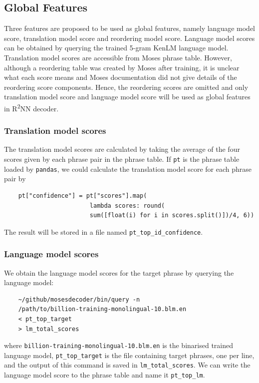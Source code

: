 \documentclass[12pt,a4paper,twoside,openright]{report}
\begin{document}
\subsection{Global Features} \label{global_features}
Three features are proposed to be used as global features, namely language model score, translation model score and reordering model score. Language model scores can be obtained by querying the trained 5-gram KenLM language model. Translation model scores are accessible from Moses phrase table. However, although a reordering table was created by Moses after training, it is unclear what each score means and Moses documentation did not give details of the reordering score components. Hence, the reordering scores are omitted and only translation model score and language model score will be used as global features in R\textsuperscript{2}NN decoder.

\subsubsection{Translation model scores}
The translation model scores are calculated by taking the average of the four scores given by each phrase pair in the phrase table. If \texttt{pt} is the phrase table loaded by \texttt{pandas}, we could calculate the translation model score for each phrase pair by

\begin{verbatim}
    pt["confidence"] = pt["scores"].map(
                        lambda scores: round(
                        sum([float(i) for i in scores.split()])/4, 6))
\end{verbatim}

The result will be stored in a file named \texttt{pt\_top\_id\_confidence}.

\subsubsection{Language model scores}
We obtain the language model scores for the target phrase by querying the language model:
\begin{verbatim}
    ~/github/mosesdecoder/bin/query -n 
    /path/to/billion-training-monolingual-10.blm.en 
    < pt_top_target
    > lm_total_scores
\end{verbatim}

where \texttt{billion-training-monolingual-10.blm.en} is the binarised trained language model, \texttt{pt\_top\_target} is the file containing target phrases, one per line, and the output of this command is saved in \texttt{lm\_total\_scores}. We can write the language model score to the phrase table and name it \texttt{pt\_top\_lm}.
\end{document}
